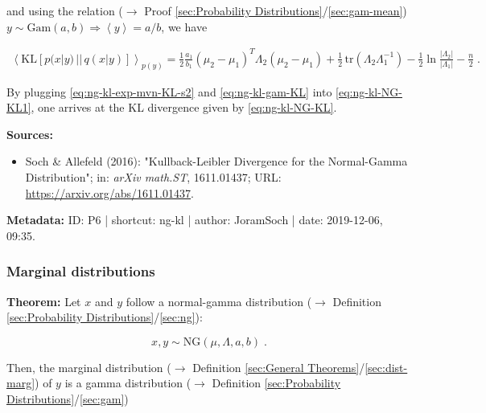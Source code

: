 \documentclass[a4paper,12pt,twoside]{book}
\begin{document}
and using the relation ($\rightarrow$ Proof \ref{sec:Probability Distributions}/\ref{sec:gam-mean}) $y \sim \mathrm{Gam}(a,b) \Rightarrow \left\langle y \right\rangle = a/b$, we have

\begin{equation} \label{eq:ng-kl-exp-mvn-KL-s2}
\begin{split}
\left\langle \mathrm{KL}[p(x|y)\,||\,q(x|y)] \right\rangle_{p(y)} = \frac{1}{2} \frac{a_1}{b_1} (\mu_2 - \mu_1)^T \Lambda_2 (\mu_2 - \mu_1) + \frac{1}{2} \, \mathrm{tr}(\Lambda_2 \Lambda_1^{-1}) - \frac{1}{2} \ln \frac{|\Lambda_2|}{|\Lambda_1|} - \frac{n}{2} \; .
\end{split}
\end{equation}

By plugging \eqref{eq:ng-kl-exp-mvn-KL-s2} and \eqref{eq:ng-kl-gam-KL} into \eqref{eq:ng-kl-NG-KL1}, one arrives at the KL divergence given by \eqref{eq:ng-kl-NG-KL}.


\vspace{1em}
\textbf{Sources:}
\begin{itemize}
\item Soch \& Allefeld (2016): "Kullback-Leibler Divergence for the Normal-Gamma Distribution"; in: \textit{arXiv math.ST}, 1611.01437; URL: \url{https://arxiv.org/abs/1611.01437}.
\end{itemize}


\vspace{1em}
\textbf{Metadata:} ID: P6 | shortcut: ng-kl | author: JoramSoch | date: 2019-12-06, 09:35.
\vspace{1em}



\subsubsection[\textbf{Marginal distributions}]{Marginal distributions} \label{sec:ng-marg}
\setcounter{equation}{0}

\textbf{Theorem:} Let $x$ and $y$ follow a normal-gamma distribution ($\rightarrow$ Definition \ref{sec:Probability Distributions}/\ref{sec:ng}):

\begin{equation} \label{eq:ng-marg-ng}
x,y \sim \mathrm{NG}(\mu, \Lambda, a, b) \; .
\end{equation}

Then, the marginal distribution ($\rightarrow$ Definition \ref{sec:General Theorems}/\ref{sec:dist-marg}) of $y$ is a gamma distribution ($\rightarrow$ Definition \ref{sec:Probability Distributions}/\ref{sec:gam})
\end{document}
